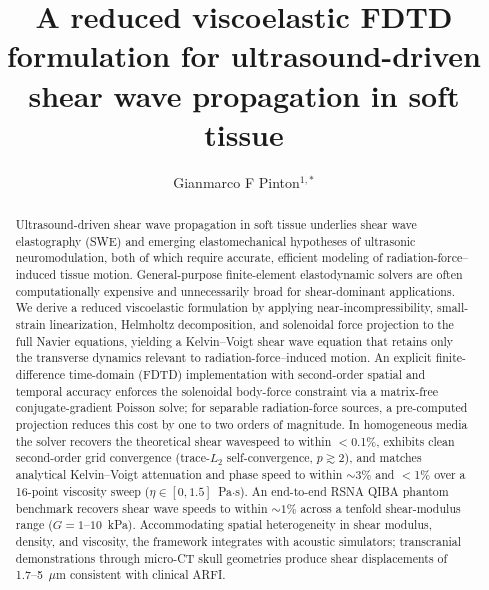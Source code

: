 \documentclass{iopjournal}
\begin{document}
\justifying
{}


\title{A reduced viscoelastic FDTD formulation for ultrasound-driven shear wave propagation in soft tissue}

\author{Gianmarco F Pinton$^{1,*}$}





\begin{abstract}
Ultrasound-driven shear wave propagation in soft tissue underlies shear wave
elastography (SWE) and emerging elastomechanical hypotheses of ultrasonic
neuromodulation, both of which require accurate, efficient modeling of
radiation-force--induced tissue motion. General-purpose finite-element
elastodynamic solvers are often computationally expensive and unnecessarily
broad for shear-dominant applications. We derive a reduced viscoelastic
formulation by applying near-incompressibility, small-strain linearization,
Helmholtz decomposition, and solenoidal force projection to the full Navier
equations, yielding a Kelvin--Voigt shear wave equation that retains only the
transverse dynamics relevant to radiation-force--induced motion. An explicit
finite-difference time-domain (FDTD) implementation with second-order spatial
and temporal accuracy enforces the solenoidal body-force constraint via a
matrix-free conjugate-gradient Poisson solve; for separable radiation-force
sources, a pre-computed projection reduces this cost by one to two orders of
magnitude. In homogeneous media the solver recovers the theoretical shear
wavespeed to within $<$0.1\%, exhibits clean second-order grid convergence
(trace-$L_2$ self-convergence, $p\gtrsim2$), and matches analytical
Kelvin--Voigt attenuation and phase speed to within ${\sim}3\%$ and $<$1\% over
a 16-point viscosity sweep ($\eta\in[0,1.5]$~Pa$\cdot$s). An end-to-end RSNA
QIBA phantom benchmark recovers shear wave speeds to within ${\sim}1\%$ across a
tenfold shear-modulus range ($G=1$--$10$~kPa). Accommodating spatial
heterogeneity in shear modulus, density, and viscosity, the framework integrates
with acoustic simulators; transcranial demonstrations through micro-CT skull
geometries produce shear displacements of 1.7--5~$\mu$m consistent with clinical
ARFI.
\end{abstract}
\end{document}
